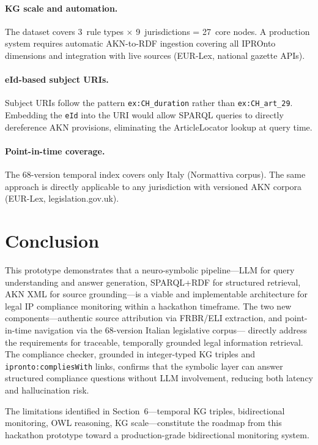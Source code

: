 \documentclass[12pt,a4paper]{article}
\begin{document}
\paragraph{KG scale and automation.}
The dataset covers 3~rule types $\times$ 9~jurisdictions = 27~core nodes.
A production system requires automatic AKN-to-RDF ingestion covering all
IPROnto dimensions and integration with live sources (EUR-Lex, national
gazette APIs).

\paragraph{eId-based subject URIs.}
Subject URIs follow the pattern \texttt{ex:CH\_duration} rather than
\texttt{ex:CH\_art\_29}. Embedding the \texttt{eId} into the URI would
allow SPARQL queries to directly dereference AKN provisions, eliminating
the ArticleLocator lookup at query time.

\paragraph{Point-in-time coverage.}
The 68-version temporal index covers only Italy (Normattiva corpus). The
same approach is directly applicable to any jurisdiction with versioned
AKN corpora (EUR-Lex, legislation.gov.uk).

\section{Conclusion}

This prototype demonstrates that a neuro-symbolic pipeline---LLM for query
understanding and answer generation, SPARQL+RDF for structured retrieval,
AKN XML for source grounding---is a viable and implementable architecture
for legal IP compliance monitoring within a hackathon timeframe. The two
new components---authentic source attribution via FRBR/ELI extraction, and
point-in-time navigation via the 68-version Italian legislative corpus---
directly address the requirements for traceable, temporally grounded legal
information retrieval. The compliance checker, grounded in integer-typed
KG triples and \texttt{ipronto:compliesWith} links, confirms that the
symbolic layer can answer structured compliance questions without LLM
involvement, reducing both latency and hallucination risk.

The limitations identified in Section~6---temporal KG triples,
bidirectional monitoring, OWL reasoning, KG scale---constitute the roadmap
from this hackathon prototype toward a production-grade bidirectional
monitoring system.
\end{document}
